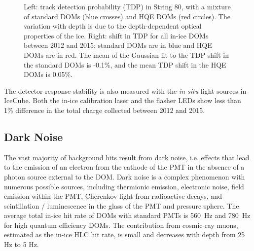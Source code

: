\begin{figure}[!h]
  \captionsetup[subfigure]{labelformat=empty}
  \centering
  \vspace{-1\baselineskip}  
  \caption{Left: track detection probability (TDP) in String 80, with a
    mixture of standard DOMs (blue crosses) and HQE DOMs (red
    circles). The variation with depth is due to the depth-dependent
    optical properties of the ice. Right: shift in TDP for all in-ice DOMs between 2012 and 2015; standard DOMs are in blue and
    HQE DOMs are in red. The mean of the Gaussian fit to
    the TDP shift in the standard DOMs is -0.1\%, and the mean 
    TDP shift in the HQE DOMs is 0.05\%.}
  \label{fig:tdp}
\end{figure}

The detector response stability is also measured with the {\it in
  situ} light sources in IceCube. Both the in-ice calibration laser
\cite{IC3:SC} and the flasher LEDs show less than 1\% difference in the total
charge collected between 2012 and 2015. 

\subsection{\label{sect:darknoise}Dark Noise}

The vast majority of background hits result from dark noise, i.e. effects
that lead to the emission of an electron from the cathode of the PMT in the
absence of a photon source external to the DOM. 
Dark noise is a complex phenomenon with numerous possible sources,
including thermionic emission, electronic noise, field emission 
within the PMT, Cherenkov light from radioactive decays, and
scintillation / luminescence in the glass of the PMT and pressure sphere.
The average total in-ice hit rate of DOMs with standard PMTs is
\SI{560}{\hertz} and \SI{780}{\hertz} for high quantum efficiency DOMs. The
contribution from cosmic-ray muons, estimated as the in-ice HLC hit rate,
is small and decreases with depth from 25 Hz to 5 Hz. 

